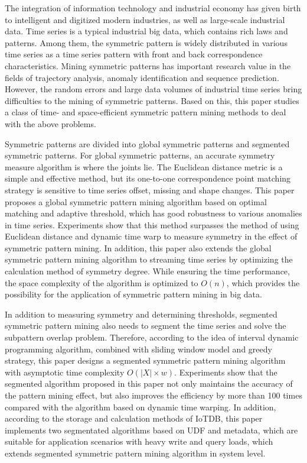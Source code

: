\begin{abstract*}
  The integration of information technology and industrial 
  economy has given birth to intelligent and digitized 
  modern industries, as well as large-scale industrial 
  data. Time series is a typical industrial big data, 
  which contains rich laws and patterns. Among them, 
  the symmetric pattern is widely distributed in various 
  time series as a time series pattern with front and back 
  correspondence characteristics. Mining symmetric patterns 
  has important research value in the fields of trajectory 
  analysis, anomaly identification and sequence prediction. 
  However, the random errors and large data volumes of 
  industrial time series bring difficulties to the mining 
  of symmetric patterns. Based on this, this paper studies 
  a class of time- and space-efficient symmetric pattern 
  mining methods to deal with the above problems.

  Symmetric patterns are divided into global symmetric 
  patterns and segmented symmetric patterns. For global 
  symmetric patterns, an accurate symmetry measure algorithm 
  is where the joints lie. The Euclidean distance metric 
  is a simple and effective method, but its one-to-one 
  correspondence point matching strategy is sensitive to 
  time series offset, missing and shape changes. This paper 
  proposes a global symmetric pattern mining algorithm based 
  on optimal matching and adaptive threshold, which has good 
  robustness to various anomalies in time series. 
  Experiments show that this method surpasses the method of 
  using Euclidean distance and dynamic time warp to measure 
  symmetry in the effect of symmetric pattern mining. In 
  addition, this paper also extends the global symmetric 
  pattern mining algorithm to streaming time series by 
  optimizing the calculation method of symmetry degree. 
  While ensuring the time performance, the space complexity 
  of the algorithm is optimized to $O(n)$, which provides 
  the possibility for the application of symmetric pattern 
  mining in big data.

  In addition to measuring symmetry and determining 
  thresholds, segmented symmetric pattern mining 
  also needs to segment the time series and solve 
  the subpattern overlap problem. Therefore, 
  according to the idea of interval dynamic programming 
  algorithm, combined with sliding window model and greedy 
  strategy, this paper designs a segmented symmetric pattern
  mining algorithm with asymptotic time 
  complexity $O\left( \left| X \right| \times w \right)$.
  Experiments show that the segmented algorithm proposed 
  in this paper not only maintains the accuracy of the 
  pattern mining effect, but also improves the efficiency 
  by more than 100 times compared with the algorithm 
  based on dynamic time warping. In addition, 
  according to the storage and calculation methods of IoTDB, 
  this paper implements two segmentated algorithms 
  based on UDF and metadata, which are suitable for 
  application scenarios with heavy write and 
  query loads, which extends segmented symmetric 
  pattern mining algorithm in system level.


\end{abstract*}
